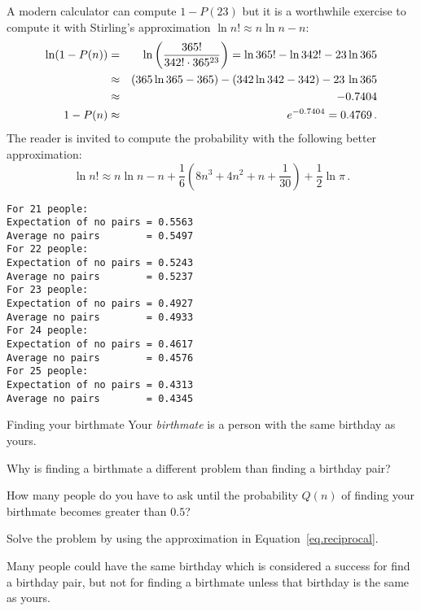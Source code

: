 A modern calculator can compute $1-P(23)$ but it is a worthwhile exercise to compute it with Stirling's approximation $\ln n! \approx n\ln n - n$:
\begin{eqnarray*}
\ln (1-P(n))&=&
  \ln\left(\displaystyle\frac{365!}{342!\cdot 365^{23}}\right)=\ln 365! - \ln 342! -23 \ln 365\\
&\approx& (365\ln 365 -365) - (342\ln 342 -342) - 23\,\ln 365 \\
&\approx&-0.7404\\
1-P(n)&\approx&e^{-0.7404}=0.4769\,.
\end{eqnarray*}
The reader is invited to compute the probability with the following better approximation:
\[
\ln n!  \approx n\ln n - n + \frac{1}{6}\left(8n^3+4n^2+n+\frac{1}{30}\right)+\frac{1}{2}\ln\pi\,.
\]
\sml{}
\begin{verbatim}
For 21 people:
Expectation of no pairs = 0.5563
Average no pairs        = 0.5497
For 22 people:
Expectation of no pairs = 0.5243
Average no pairs        = 0.5237
For 23 people:
Expectation of no pairs = 0.4927
Average no pairs        = 0.4933
For 24 people:
Expectation of no pairs = 0.4617
Average no pairs        = 0.4576
For 25 people:
Expectation of no pairs = 0.4313
Average no pairs        = 0.4345
\end{verbatim}


\begin{prob}{Finding your birthmate}
Your \emph{birthmate} is a person with the same birthday as yours.

Why is finding a birthmate a different problem than finding a birthday pair?

 How many people do you have to ask until the probability $Q(n)$ of finding your birthmate becomes greater than $0.5$?

Solve the problem by using the approximation in Equation~\ref{eq.reciprocal}.
\end{prob}

\solution{}

Many people could have the same birthday which is considered a success for find a birthday pair, but not for finding a birthmate unless that birthday is the same as yours.

